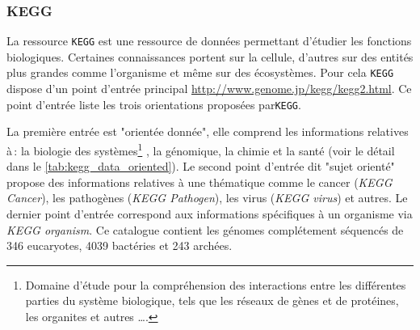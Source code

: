 \begin{refsegment}
    \subsubsection{KEGG}
    
    La ressource \texttt{\gls{KEGG}} \cite{ogata1999kegg,kanehisa2000kegg,kanehisa2002kegg,kanehisa2004kegg,aoki2005using,kanehisa2010kegg,kanehisa2017kegg} est une ressource de données permettant d'étudier les fonctions biologiques. Certaines connaissances portent sur la cellule, d'autres sur des entités plus grandes comme l'organisme et même sur  des écosystèmes. Pour cela \texttt{\gls{KEGG}} dispose d'un point d'entrée principal \url{http://www.genome.jp/kegg/kegg2.html}. Ce point d'entrée liste les trois orientations proposées par\texttt{\gls{KEGG}}.
    
    La première entrée est "orientée donnée", elle comprend les informations relatives à : la biologie des systèmes\footnote{Domaine d'étude pour la compréhension des interactions entre les différentes parties du système biologique, tels que les réseaux de gènes et de protéines, les organites et autres \ldots. } , la génomique, la chimie et la santé (voir le détail dans le \cref{tab:kegg_data_oriented}). Le second point d'entrée dit "sujet orienté" propose des informations relatives à une thématique comme le cancer (\textit{KEGG Cancer}), les pathogènes (\textit{KEGG Pathogen}), les virus (\textit{KEGG virus}) et autres. Le dernier point d'entrée correspond aux informations spécifiques à un organisme via \textit{KEGG organism}. Ce catalogue contient les génomes complétement séquencés de 346 eucaryotes, 4039 bactéries et 243 archées.  
    

\end{refsegment}
